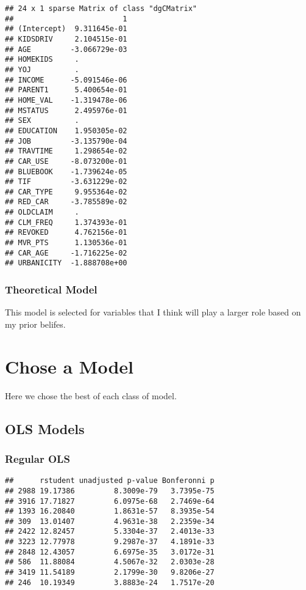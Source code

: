 \documentclass[]{article}
\begin{document}
\begin{verbatim}
## 24 x 1 sparse Matrix of class "dgCMatrix"
##                         1
## (Intercept)  9.311645e-01
## KIDSDRIV     2.104515e-01
## AGE         -3.066729e-03
## HOMEKIDS     .           
## YOJ          .           
## INCOME      -5.091546e-06
## PARENT1      5.400654e-01
## HOME_VAL    -1.319478e-06
## MSTATUS      2.495976e-01
## SEX          .           
## EDUCATION    1.950305e-02
## JOB         -3.135790e-04
## TRAVTIME     1.298654e-02
## CAR_USE     -8.073200e-01
## BLUEBOOK    -1.739624e-05
## TIF         -3.631229e-02
## CAR_TYPE     9.955364e-02
## RED_CAR     -3.785589e-02
## OLDCLAIM     .           
## CLM_FREQ     1.374393e-01
## REVOKED      4.762156e-01
## MVR_PTS      1.130536e-01
## CAR_AGE     -1.716225e-02
## URBANICITY  -1.888708e+00
\end{verbatim}

\hypertarget{theoretical-model}{%
\subsubsection{Theoretical Model}\label{theoretical-model}}

This model is selected for variables that I think will play a larger
role based on my prior belifes.

\hypertarget{chose-a-model}{%
\section{Chose a Model}\label{chose-a-model}}

Here we chose the best of each class of model.

\hypertarget{ols-models}{%
\subsection{OLS Models}\label{ols-models}}

\hypertarget{regular-ols}{%
\subsubsection{Regular OLS}\label{regular-ols}}

\begin{verbatim}
##      rstudent unadjusted p-value Bonferonni p
## 2988 19.17386         8.3009e-79   3.7395e-75
## 3916 17.71827         6.0975e-68   2.7469e-64
## 1393 16.20840         1.8631e-57   8.3935e-54
## 309  13.01407         4.9631e-38   2.2359e-34
## 2422 12.82457         5.3304e-37   2.4013e-33
## 3223 12.77978         9.2987e-37   4.1891e-33
## 2848 12.43057         6.6975e-35   3.0172e-31
## 586  11.88084         4.5067e-32   2.0303e-28
## 3419 11.54189         2.1799e-30   9.8206e-27
## 246  10.19349         3.8883e-24   1.7517e-20
\end{verbatim}
\end{document}
